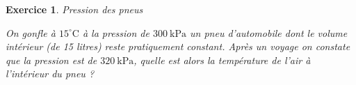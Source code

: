 \documentclass[a4paper,12pt]{article}
\newtheorem{exercice}{Exercice}
\newtheorem{corrige}{Corrig\'e exercice}
\newcommand{\C}{\mathrm{C}}
\newcommand{\oC}{^\circ\C}
\begin{document}
\begin{exercice}{Pression des pneus}

On gonfle à $15\oC$ à la pression de $300\ \mathrm{kPa}$ un pneu d’automobile dont le volume intérieur
(de 15 litres) reste pratiquement constant.
Après un voyage on constate que la pression est de $320\ \mathrm{kPa}$, quelle est alors la température de l’air à
l’intérieur du pneu ?
\end{exercice}























\end{document}
